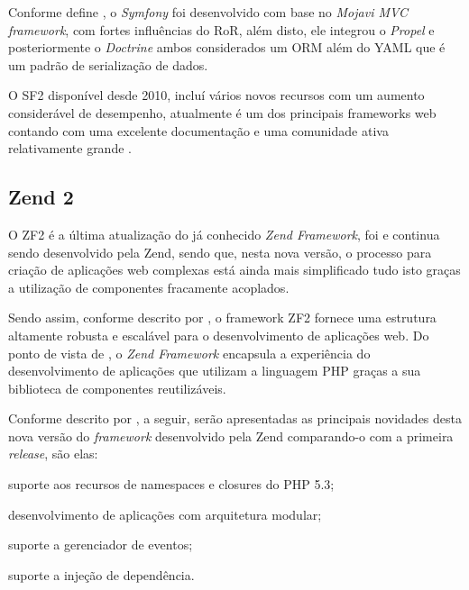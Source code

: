 Conforme define
, o
\textit{Symfony} foi desenvolvido com base no \textit{Mojavi MVC framework},
com fortes influências do \ac{RoR}, além disto, ele integrou o \textit{Propel} e
posteriormente o \textit{Doctrine} ambos considerados um \ac{ORM} além do
\ac{YAML} que é um padrão de serialização de dados.

O \ac{SF2} disponível desde 2010, incluí vários novos recursos com um aumento
considerável de desempenho, atualmente é um dos principais frameworks web
contando com uma excelente documentação e uma comunidade ativa relativamente
grande \cite{buildingPHPApplicationsWithSymfonyCakePHPAndZendFramework}.

\subsection{Zend 2}

O \ac{ZF2} é a última atualização do já conhecido \textit{Zend
Framework}, foi e continua sendo desenvolvido pela \acs{Zend}, sendo que, nesta
nova versão, o processo para criação de aplicações web complexas está ainda mais
simplificado tudo isto graças a utilização de componentes fracamente acoplados.

Sendo assim, conforme descrito por
, o framework \acs{ZF2}
fornece uma estrutura altamente robusta e escalável para o desenvolvimento de 
aplicações web. Do ponto de vista de
, o 
\textit{Zend Framework} encapsula a experiência do desenvolvimento de aplicações
que utilizam a linguagem \acs{PHP} graças a sua biblioteca de componentes 
reutilizáveis.

Conforme descrito por , a
seguir, serão apresentadas as principais novidades desta nova versão do 
\textit{framework} desenvolvido pela \acs{Zend} comparando-o com a primeira
\textit{release}, são elas:

\begin{alineas}
    \item suporte aos recursos de namespaces e closures do \acs{PHP} 5.3;
    \item desenvolvimento de aplicações com arquitetura modular;
    \item suporte a gerenciador de eventos;
    \item suporte a injeção de dependência.
\end{alineas}
